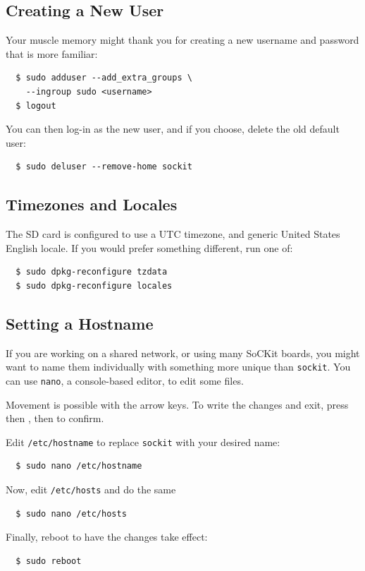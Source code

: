 \documentclass{sockitguide}
\begin{document}
\subsection{Creating a New User}

Your muscle memory might thank you for creating a new username and
password that is more familiar:
\begin{verbatim}
  $ sudo adduser --add_extra_groups \
    --ingroup sudo <username>
  $ logout
\end{verbatim}

You can then log-in as the new user, and if you choose, delete the old
default user:
\begin{verbatim}
  $ sudo deluser --remove-home sockit
\end{verbatim}

\subsection{Timezones and Locales}

The SD card is configured to use a UTC timezone, and generic United
States English locale. If you would prefer something different, run
one of:
\begin{verbatim}
  $ sudo dpkg-reconfigure tzdata
  $ sudo dpkg-reconfigure locales
\end{verbatim}

\subsection{Setting a Hostname}

If you are working on a shared network, or using many SoCKit boards,
you might want to name them individually with something more unique
than \texttt{sockit}. You can use \texttt{nano}, a console-based
editor, to edit some files.

Movement is possible with the arrow keys. To write the changes and exit, press  then , then \keys{\enterwin} to confirm.

Edit \texttt{/etc/hostname} to replace \texttt{sockit} with your desired name:
\begin{verbatim}
  $ sudo nano /etc/hostname
\end{verbatim}

Now, edit \texttt{/etc/hosts} and do the same
\begin{verbatim}
  $ sudo nano /etc/hosts
\end{verbatim}

Finally, reboot to have the changes take effect:
\begin{verbatim}
  $ sudo reboot
\end{verbatim}
\end{document}
